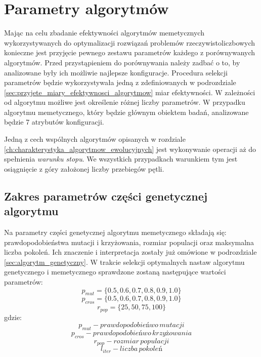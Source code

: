 \section{Parametry algorytmów}
\label{sec:parametry_algorytmow}
\par
Mając na celu zbadanie efektywności algorytmów memetycznych wykorzystywanych do optymalizacji rozwiązań problemów rzeczywistoliczbowych konieczne jest przyjęcie pewnego zestawu parametrów każdego z porównywanych algorytmów. Przed przystąpieniem do porównywania należy zadbać o to, by analizowane były ich możliwie najlepsze konfiguracje. Procedura selekcji parametrów będzie wykorzystywała jedną z zdefiniowanych w podrozdziale \ref{sec:przyjete_miary_efektywnosci_algorytmow} miar efektywności. W zależności od algorytmu możliwe jest określenie różnej liczby parametrów. W przypadku algorytmu memetycznego, który będzie głównym obiektem badań, analizowane będzie 7 atrybutów konfiguracji.
\par
Jedną z cech wspólnych algorytmów opisanych w rozdziale \ref{ch:charakterystyka_algorytmow_ewolucyjnych} jest wykonywanie operacji aż do spełnienia \emph{warunku stopu}. We wszystkich przypadkach warunkiem tym jest osiągnięcie z góry założonej liczby przebiegów pętli. 
\subsection{Zakres parametrów części genetycznej algorytmu}
%
Na parametry części genetycznej algorytmu memetycznego składają się: prawdopodobieństwa mutacji i krzyżowania, rozmiar populacji oraz maksymalna liczba pokoleń. Ich znaczenie i interpretacja zostały już omówione w podrozdziale \ref{sec:algorytm_genetyczny}. W trakcie selekcji optymalnych nastaw algorytmu genetycznego i memetycznego sprawdzone zostaną następujące wartości parametrów:
\[p_{mut} = \lbrace0.5, 0.6, 0.7, 0.8, 0.9, 1.0\rbrace\]
\[p_{cros} = \lbrace0.5, 0.6, 0.7, 0.8, 0.9, 1.0\rbrace\]
\[r_{pop}=\lbrace25, 50, 75, 100\rbrace\]
gdzie:
\[p_{mut} - prawdopodobieńwo\, mutacji\]
\[p_{cros} - prawdopodobieńwo\, krzyżowania\]
\[r_{pop} - rozmiar\, populacji\]
\[l_{iter} - liczba\, pokoleń\]

